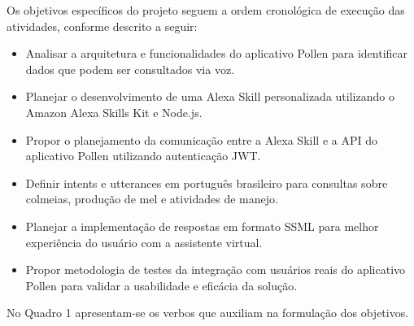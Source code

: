 \label{ssec:objetivos-especificos}

Os objetivos específicos do projeto seguem a ordem cronológica de execução das atividades, conforme descrito a seguir:

\begin{itemize}
    \item Analisar a arquitetura e funcionalidades do aplicativo Pollen para identificar dados que podem ser consultados via voz.
    
    \item Planejar o desenvolvimento de uma Alexa Skill personalizada utilizando o Amazon Alexa Skills Kit e Node.js.

    \item Propor o planejamento da comunicação entre a Alexa Skill e a API do aplicativo Pollen utilizando autenticação JWT.

    \item Definir intents e utterances em português brasileiro para consultas sobre colmeias, produção de mel e atividades de manejo.

    \item Planejar a implementação de respostas em formato SSML para melhor experiência do usuário com a assistente virtual.

    \item Propor metodologia de testes da integração com usuários reais do aplicativo Pollen para validar a usabilidade e eficácia da solução.
\end{itemize}

No Quadro 1 apresentam-se os verbos que auxiliam na formulação dos objetivos.

